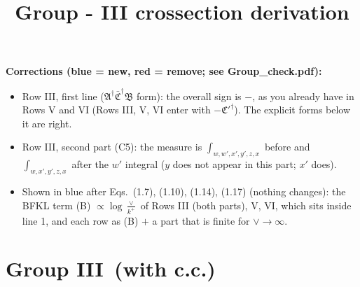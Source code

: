 \documentclass[9pt]{article}
\title{Group - III crossection derivation}
\author{}
\date{}
\numberwithin{equation}{section}
\begin{document}
\maketitle
{\color{blue}\noindent\textbf{Corrections (blue = new, red = remove; see Group\_check.pdf):}
\begin{itemize}
\item Row III, first line ($\mathfrak A^\dagger\bar{\mathfrak C}^\dagger\mathfrak B$ form): the overall sign is $-$, as you already have in Rows V and VI (Rows III, V, VI enter with $-\mathfrak C'^\dagger$). The explicit forms below it are right.
\item Row III, second part (C5): the measure is $\int_{w,w',x',y',z,x}$ before and $\int_{w,x',y',z,x}$ after the $w'$ integral ($y$ does not appear in this part; $x'$ does).
\item Shown in blue after Eqs.~(1.7), (1.10), (1.14), (1.17) (nothing changes): the BFKL term (B) $\propto\log\frac{\vee}{k^+}$ of Rows III (both parts), V, VI, which sits inside line 1, and each row as (B) $+$ a part that is finite for $\vee\to\infty$.
\end{itemize}}

\section{Group III\, (with c.c.)}
\end{document}

